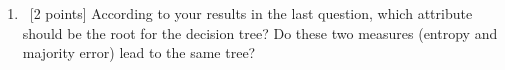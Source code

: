 \begin{enumerate}
\begin{enumerate}
  \item~[2 points] According to your results in the last question, which
    attribute should be the root for the decision tree?  Do these two measures
    (entropy and majority error) lead to the same tree?
  \end{enumerate}

\end{enumerate}



